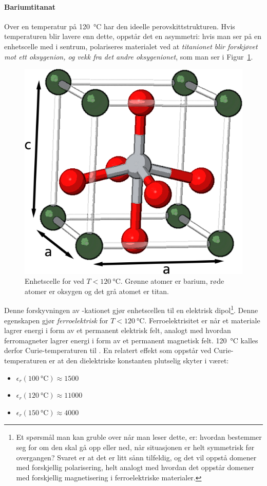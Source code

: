 \paragraph{Bariumtitanat} Over en temperatur på \SI{120}{\celsius} har  den ideelle perovskittstrukturen. Hvis temperaturen blir lavere enn dette, oppstår det en asymmetri: hvis man ser på en enhetscelle med  i sentrum, polariseres materialet ved at \emph{titanionet blir forskjøvet mot ett oksygenion, og vekk fra det andre oksygenionet}, som man ser i Figur~\ref{fig:perovskite_cell}.
\begin{figure}[H]
	\bmd\centering
	\includegraphics[width=0.9\linewidth]{perovskite.png}
	\caption{Enhetscelle for  ved $T<\SI{120}{\celsius}$. Grønne atomer er barium, røde atomer er oksygen og det grå atomet er titan.}
	\label{fig:perovskite_cell}
\emd\end{figure}
Denne forskyvningen av -kationet gjør enhetscellen til en elektrisk dipol\footnote{Et spørsmål man kan gruble over når man leser dette, er: hvordan bestemmer  seg for om den skal gå opp eller ned, når situasjonen er helt symmetrisk før overgangen? Svaret er at det er litt sånn tilfeldig, og det vil oppstå domener med forskjellig polarisering, helt analogt med hvordan det oppstår domener med forskjellig magnetisering i ferroelektriske materialer.}. Denne egenskapen gjør  \emph{ferroelektrisk} for $T<\SI{120}{\celsius}$. Ferroelektrisitet er når et materiale lagrer energi i form av et permanent elektrisk felt, analogt med hvordan ferromagneter lagrer energi i form av et permanent magnetisk felt. \SI{120}{\celsius} kalles derfor Curie-temperaturen til . En relatert effekt som oppstår ved Curie-temperaturen er at den dielektriske konstanten plutselig skyter i været:
\begin{itemize}
	\item $\epsilon_r(\SI{100}{\celsius})\approx 1500$
	\item $\epsilon_r(\SI{120}{\celsius})\approx 11000$
	\item $\epsilon_r(\SI{150}{\celsius})\approx 4000$	
\end{itemize}

